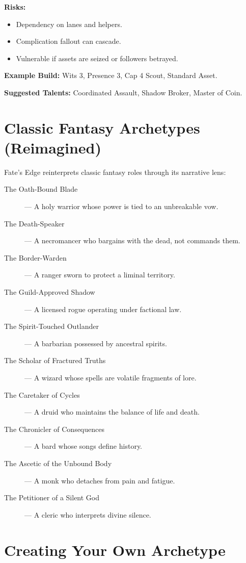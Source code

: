 \textbf{Risks:}
\begin{itemize}
  \item Dependency on lanes and helpers.
  \item Complication fallout can cascade.
  \item Vulnerable if assets are seized or followers betrayed.
\end{itemize}

\textbf{Example Build:} Wits 3, Presence 3, Cap 4 Scout, Standard Asset.

\textbf{Suggested Talents:} Coordinated Assault, Shadow Broker, Master of Coin.

\section{Classic Fantasy Archetypes (Reimagined)}

Fate's Edge reinterprets classic fantasy roles through its narrative lens:

\begin{description}
  \item[The Oath-Bound Blade] — A holy warrior whose power is tied to an unbreakable vow.
  \item[The Death-Speaker] — A necromancer who bargains with the dead, not commands them.
  \item[The Border-Warden] — A ranger sworn to protect a liminal territory.
  \item[The Guild-Approved Shadow] — A licensed rogue operating under factional law.
  \item[The Spirit-Touched Outlander] — A barbarian possessed by ancestral spirits.
  \item[The Scholar of Fractured Truths] — A wizard whose spells are volatile fragments of lore.
  \item[The Caretaker of Cycles] — A druid who maintains the balance of life and death.
  \item[The Chronicler of Consequences] — A bard whose songs define history.
  \item[The Ascetic of the Unbound Body] — A monk who detaches from pain and fatigue.
  \item[The Petitioner of a Silent God] — A cleric who interprets divine silence.
\end{description}

\section{Creating Your Own Archetype}

